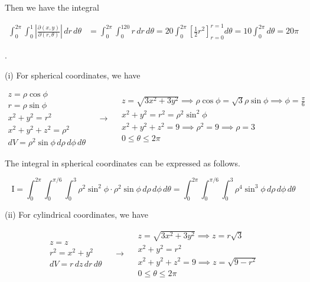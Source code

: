 \documentclass{article}
\begin{document}
\hfill

\noindent Then we have the integral

\begin{align*}\int_0^{2\pi}\int_0^1\left|\frac{\partial(x,y)}{\partial(r,\theta)}\right|\,dr\,d\theta&=\int_0^{2\pi}\int_0^120r\,dr\,d\theta=20\int_0^{2\pi}\left[\frac12r^2\right]_{r=0}^{r=1}d\theta=10\int_0^{2\pi}d\theta=\boxed{20\pi}\end{align*}

\hfill

.

\hfill

\noindent (i) For spherical coordinates, we have

\[
\begin{array}{c}
z=\rho\cos\phi\\
r=\rho\sin\phi\\
x^2+y^2=r^2\\
x^2+y^2+z^2=\rho^2\\
dV=\rho^2\sin\phi\,d\rho\,d\phi\,d\theta
\end{array}\quad\rightarrow\quad
\begin{array}{c}
\displaystyle z=\sqrt{3x^2+3y^2}\implies\rho\cos\phi=\sqrt3\rho\sin\phi\implies\phi=\frac\pi6\\[0.2cm]
x^2+y^2=r^2=\rho^2\sin^2\phi\\[0.1cm]
x^2+y^2+z^2=9\implies\rho^2=9\implies\rho=3\\[0.1cm]
0\leq\theta\leq2\pi
\end{array}
\]

\hfill

\noindent The integral in spherical coordinates can be expressed as follows.

\[\boxed{\mathrm{I}=\int_0^{2\pi}\int_0^{\pi/6}\int_{0}^3\rho^2\sin^2\phi\cdot\rho^2\sin\phi\,d\rho\,d\phi\,d\theta=\int_0^{2\pi}\int_0^{\pi/6}\int_{0}^3\rho^4\sin^3\phi\,d\rho\,d\phi\,d\theta}\]

\hfill

\noindent (ii) For cylindrical coordinates, we have

\[
\begin{array}{c}
z=z\\
r^2=x^2+y^2\\
dV=r\,dz\,dr\,d\theta
\end{array}\quad\rightarrow\quad
\begin{array}{c}
z=\sqrt{3x^2+3y^2}\implies z=r\sqrt3\\[0.1cm]
x^2+y^2=r^2\\[0.1cm]
x^2+y^2+z^2=9\implies z=\sqrt{9-r^2}\\[0.1cm]
0\leq\theta\leq2\pi
\end{array}
\]
\end{document}
